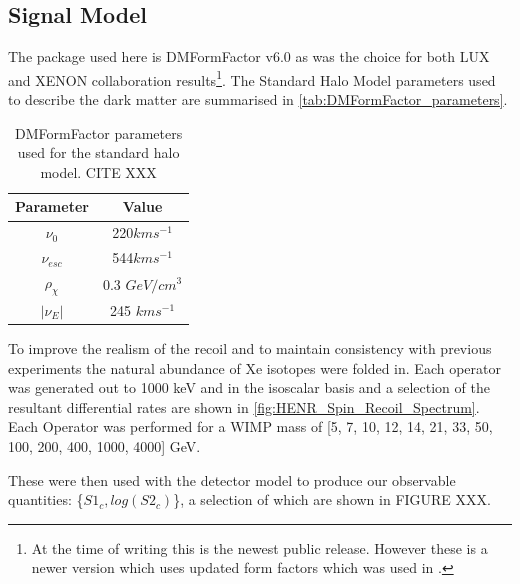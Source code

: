 \subsection{Signal Model}
\par
The package used here is DMFormFactor v6.0 as was the choice for both LUX and XENON collaboration results\footnote{At the time of writing this is the newest public release. However these is a newer version which uses updated form factors which was used in \cite{pandax_2_eft_ref}.}.
The Standard Halo Model parameters used to describe the dark matter are summarised in \autoref{tab:DMFormFactor_parameters}.
\begin{table}[]
    \centering
    \begin{tabular}{c|c}
        Parameter         & Value  \\ \hline
        $\nu_0$           & 220$km s^{-1}$ \\
        $\nu_{esc}$       & 544$km s^{-1}$ \\
        $\rho_{\chi}$     & 0.3 $GeV/cm^{3}$ \\
        $|\nu_E|$         & 245 $km s^{-1}$ 
    \end{tabular}
    \caption{DMFormFactor parameters used for the standard halo model. CITE XXX}
    \label{tab:DMFormFactor_parameters}
\end{table}
To improve the realism of the recoil and to maintain consistency with previous experiments the natural abundance of Xe isotopes were folded in.
Each operator was generated out to 1000 keV and in the isoscalar basis and a selection of the resultant differential rates are shown in \autoref{fig:HENR_Spin_Recoil_Spectrum}.
Each Operator was performed for a WIMP mass of [5, 7, 10, 12, 14, 21, 33, 50, 100, 200, 400, 1000, 4000] GeV.



\par
These were then used with the detector model to produce our observable quantities: \{$S1_c,log(S2_c)$\}, a selection of which are shown in FIGURE XXX.




